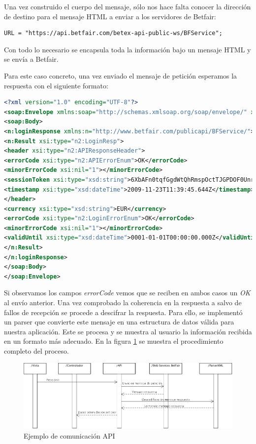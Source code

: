   Una vez construido el cuerpo del mensaje, sólo nos hace falta conocer la dirección de destino para el mensaje HTML a enviar a los servidores de Betfair:
  
\begin{lstlisting}[frame=single, language=xml,basicstyle=\small, keywordstyle = \color{blue}] 
  	URL = "https://api.betfair.com/betex-api-public-ws/BFService";
\end{lstlisting}

  Con todo lo necesario se encapsula toda la información bajo un mensaje HTML y se envía a Betfair. 
  
  Para este caso concreto, una vez enviado el mensaje de petición esperamos la respuesta con el siguiente formato:

\begin{lstlisting}[frame=single, language=xml,basicstyle=\small, keywordstyle = \color{blue}] 
<?xml version="1.0" encoding="UTF-8"?>
<soap:Envelope xmlns:soap="http://schemas.xmlsoap.org/soap/envelope/" xmlns:xsi="http://www.w3.org/2001/XMLSchema-instance" xmlns:n2="http://www.betfair.com/publicapi/types/" xmlns:xsd="http://www.w3.org/2001/XMLSchema">
<soap:Body>
<n:loginResponse xmlns:n="http://www.betfair.com/publicapi/BFService/">
<n:Result xsi:type="n2:LoginResp">
<header xsi:type="n2:APIResponseHeader">
<errorCode xsi:type="n2:APIErrorEnum">OK</errorCode>
<minorErrorCode xsi:nil="1"></minorErrorCode>
<sessionToken xsi:type="xsd:string">6XbAFn0tqfGgdWtQhRmspOctTJGPDOF0Unr2+5WWngk=</sessionToken>
<timestamp xsi:type="xsd:dateTime">2009-11-23T11:39:45.644Z</timestamp>
</header>
<currency xsi:type="xsd:string">EUR</currency>
<errorCode xsi:type="n2:LoginErrorEnum">OK</errorCode>
<minorErrorCode xsi:nil="1"></minorErrorCode>
<validUntil xsi:type="xsd:dateTime">0001-01-01T00:00:00.000Z</validUntil>
</n:Result>
</n:loginResponse>
</soap:Body>
</soap:Envelope>
 \end{lstlisting}
 
  Si observamos los campos \emph{errorCode} vemos que se reciben en ambos casos un \emph{OK} al envío anterior. Una vez comprobado la coherencia en la respuesta a salvo de fallos de recepción se procede a descifrar la respuesta. Para ello, se implementó un parser que convierte este mensaje en una estructura de datos válida para nuestra aplicación.  Este se procesa y se muestra al usuario la información recibida en un formato más adecuado. En la figura \ref{fig:proceso} se muestra el procedimiento completo del proceso.
       
 \begin{figure}[h!]
    \centering
       \includegraphics[width=1.2\textwidth]{./images/modelo_accion.png}
     \caption{Ejemplo de comunicación API }
   \label{fig:proceso}
\end{figure}
 
